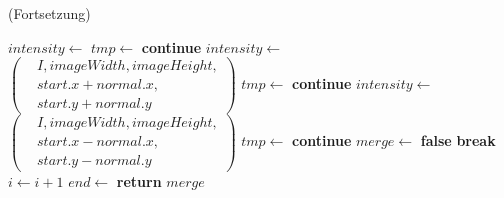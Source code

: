 \begin{algorithm}[!ht]\small
\caption{ (Fortsetzung)}
\label{alg:extendline2}
\begin{algorithmic}[1]
	\State $\mathit{intensity} \gets$ 
	\label{alg:extendline2-orientation-start}
	\State $\mathit{tmp} \gets$ 
	\label{alg:extendline2-orientation-end}
	\label{alg:extendline2-iscompatible}
		\State \textbf{continue}
	\EndIf
	\State $\mathit{intensity} \gets$ 
	$\left(
	\begin{aligned}
		& I, \mathit{imageWidth}, \mathit{imageHeight},\\
		& \mathit{start.x} + \mathit{normal.x},\\
		& \mathit{start.y} + normal.y
	\end{aligned}\right)$
	\label{alg:extendline2-pointabove}
	\State $\mathit{tmp} \gets$ 
		\State \textbf{continue}
	\EndIf
	\State $\mathit{intensity} \gets$ 
	$\left(
	\begin{aligned}
		& I, \mathit{imageWidth}, \mathit{imageHeight},\\
		& \mathit{start.x} - \mathit{normal.x},\\
		& \mathit{start.y} - normal.y
	\end{aligned}\right)$
	\label{alg:extendline2-pointbelow}
	\State $\mathit{tmp} \gets$ 
		\State \textbf{continue}
	\EndIf
	\State $\mathit{merge} \gets$ \textbf{false}
	\label{alg:extendline2-false}
	\State \textbf{break}
	\State $i \gets i + 1$
	\EndFor
	\label{alg:extendline2-loop-end}
	\State $\mathit{end} \gets$ 
	\label{alg:extendline2-endofline}
	\State \textbf{return} $\mathit{merge}$
	\label{alg:extendline2-return}
\end{algorithmic}
\end{algorithm}
